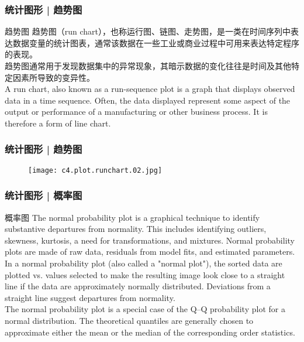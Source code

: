 \begin{frame}
  \frametitle{统计图形 | 趋势图}
  \begin{block}{趋势图}
    趋势图（run chart），也称运行图、链图、走势图，是一类在时间序列中表达数据变量的统计图表，通常该数据在一些工业或商业过程中可用来表达特定程序的表现。\\
    \vspace{0.5em}
    趋势图通常用于发现数据集中的异常现象，其暗示数据的变化往往是时间及其他特定因素所导致的变异性。\\
    \vspace{0.5em}
    A run chart, also known as a run-sequence plot is a graph that displays observed data in a time sequence. Often, the data displayed represent some aspect of the output or performance of a manufacturing or other business process. It is therefore a form of line chart.
  \end{block}
\end{frame}


\begin{frame}
  \frametitle{统计图形 | 趋势图}
  \begin{figure}
    \centering
    \texttt{[image: c4.plot.runchart.02.jpg]}
  \end{figure}
\end{frame}

\begin{frame}
  \frametitle{统计图形 | 概率图}
  \begin{block}{概率图}
    The normal probability plot is a graphical technique to identify substantive departures from normality. This includes identifying outliers, skewness, kurtosis, a need for transformations, and mixtures. Normal probability plots are made of raw data, residuals from model fits, and estimated parameters.\\
    \vspace{0.5em}
    In a normal probability plot (also called a "normal plot"), the sorted data are plotted vs. values selected to make the resulting image look close to a straight line if the data are approximately normally distributed. Deviations from a straight line suggest departures from normality.\\
    \vspace{0.5em}
The normal probability plot is a special case of the Q–Q probability plot for a normal distribution. The theoretical quantiles are generally chosen to approximate either the mean or the median of the corresponding order statistics.
  \end{block}
\end{frame}

